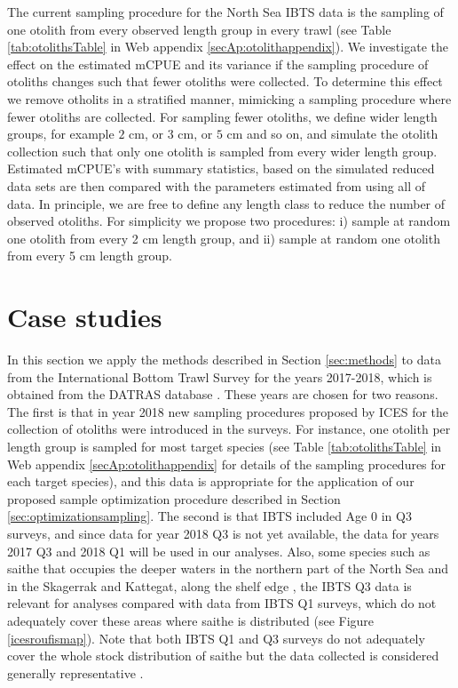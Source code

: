 \documentclass[a4paper 12pt]{article}
\numberwithin{equation}{section}
\begin{document}
The current sampling procedure for the North Sea IBTS data is the sampling of one otolith from every observed length group in every trawl (see Table \ref{tab:otolithsTable} in Web appendix \ref{secAp:otolithappendix}). We investigate the effect on the estimated mCPUE and its variance if the sampling procedure of otoliths changes such that fewer otoliths were collected. To determine this effect we remove otholits in a stratified manner, mimicking a sampling procedure where fewer otoliths are collected. For sampling fewer otoliths, we define wider length groups, for example $2$ cm, or $3$ cm, or $5$ cm and so on,  and simulate the otolith  collection such that only one otolith is sampled from every wider length group. Estimated mCPUE's with summary statistics, based on the simulated reduced data sets are then compared with the parameters estimated from using all of data. In principle, we are free to define any length class to reduce the number of observed otoliths. For simplicity we propose two procedures: i) sample at random  one otolith from every 2 cm length group, and ii) sample at random one otolith from every 5 cm length group. 


\section{Case studies}
\label{sec:data}
In this section we apply the methods described in Section \ref{sec:methods} to data from the International Bottom Trawl Survey for the years 2017-2018, which is obtained from the DATRAS database \citep{datras}. These years are chosen for two reasons. The first is that in year 2018 new sampling procedures proposed by ICES for the collection of otoliths were introduced in the surveys. For instance, one otolith per length group is sampled for most target species (see Table \ref{tab:otolithsTable} in Web appendix \ref{secAp:otolithappendix} for details of the sampling procedures for each target species), and this data is appropriate for the application of our proposed sample optimization procedure described in Section \ref{sec:optimizationsampling}. The second is that IBTS included Age 0 in Q3 surveys, and since data for year 2018 Q3 is not yet available, the data for years 2017 Q3 and 2018 Q1 will be used in our analyses. Also, some species such as saithe that occupies the deeper waters in the northern part of the North Sea and in the Skagerrak and Kattegat, along the shelf edge \citep{ICESFishMaps}, the IBTS Q3 data is relevant for analyses compared with data from IBTS Q1 surveys, which do not adequately cover these areas where saithe is distributed (see Figure \ref{icesroufismap}). Note that both IBTS Q1 and Q3 surveys do not adequately cover the whole stock distribution of saithe but the data collected is considered generally representative \citep{ICESJune2016}.
\end{document}
